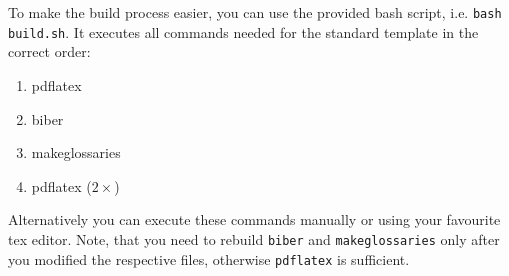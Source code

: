 
To make the build process easier, you can use the provided bash script, i.e. \verb|bash build.sh|. It executes all commands needed for the standard template in the correct order:
\begin{enumerate}
	\item pdflatex
	\item biber
	\item makeglossaries
	\item pdflatex ($2 \times$)
\end{enumerate}

Alternatively you can execute these commands manually or using your favourite tex editor. Note, that you need to rebuild \verb|biber| and \verb|makeglossaries| only after you modified the respective files, otherwise \verb|pdflatex| is sufficient.


